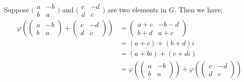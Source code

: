 \documentclass[12pt]{article}
\begin{document}
\subsection{} %

\newpage
\section{} %
Suppose $\big(\begin{smallmatrix} a & -b\\b & a\end{smallmatrix}\big)$ and $\big(\begin{smallmatrix} c & -d\\d & c\end{smallmatrix}\big)$ are two elements in $G$. Then we have:
\begin{align*}
\varphi{(
\begin{pmatrix}a & -b\\b & a\end{pmatrix}+\begin{pmatrix}c & -d\\d & c\end{pmatrix})} &=\begin{pmatrix}a+c & -b-d\\b+d & a+c\end{pmatrix} \\
&= (a+c)+(b+d)i \\
&= (a+bi)+(c+di) \\
&= \varphi{(\begin{pmatrix}a & -b\\b & a\end{pmatrix})}+\varphi{(\begin{pmatrix}c & -d\\d & c\end{pmatrix})}
\end{align*}
\end{document}
